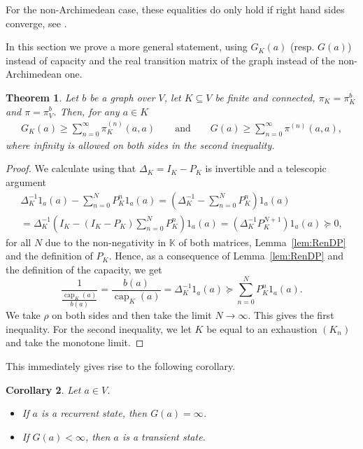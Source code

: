 \documentclass[a4paper,oneside, 12pt]{amsart}
\newtheorem{theorem}{Theorem}
\numberwithin{theorem}{section}
\newtheorem{corollary}[theorem]{Corollary}
\theoremstyle{definition}
\renewcommand{\c}{\operatorname{cap}}
\newcommand{\G}{{G}}
\newcommand{\prob}{\pi}
\begin{document}
{For the non-Archimedean case, these  equalities do only hold  if right hand sides converge, see \cite[Theorems 8.2 and 8.5]{OurPreprint}.



In this section we prove a more general statement, using $\G_K(a)$  (resp. $\G(a)$) instead of capacity and the real transition matrix of the graph instead of the non-Archimedean one.

\begin{theorem}
	Let $b$ be a  graph over $V$, let $K\subseteq V$ be finite and connected, $ \prob_{K}=\prob_{K}^{b} $ and $ \prob=\prob_{V}^{b} $. Then, for any $a\in K$ 
\begin{align*}
	\G_K(a)\ge \displaystyle\sum_{n=0}^\infty\prob^{(n)}_K(a,a)\qquad \mbox{and}\qquad
	G(a)\ge \sum_{n=0}^\infty\prob^{(n)}(a,a),
\end{align*}
	where infinity is allowed on both sides in the second inequality.
\end{theorem}
\begin{proof}
We calculate using that $ \Delta_{K}=I_{K}-P_{K} $ is invertible and a telescopic argument
	\begin{multline*}
		\Delta^{-1}_{K} 1_a(a)-\sum_{n=0}^{N}P_{K}^n 1_a(a)=\left(\Delta^{-1}_{K}-\sum_{n=0}^{N}P_{K}^n\right) 1_a(a)\\
		=\Delta^{-1}_{K}\left(I_{K}-(I_{K}-P_{K})\sum_{n=0}^{N}P_{K}^n\right) 1_a(a)=\left(\Delta^{-1}_{K}P_{K}^{N+1}\right) 1_a(a)\succeq 0,
	\end{multline*}
	for all $ N $ due to the non-negativity in $\mathbb{K}$ of both matrices, Lemma~\ref{lem:RenDP} and the definition of $P_K$. 
	Hence, as a consequence of Lemma~\ref{lem:RenDP} and the definition of the capacity, we get
	$$
\frac{1}{\frac{\c_K(a)}{b(a)}}=	\dfrac{b(a)}{\c_K(a)}=
	\Delta^{-1}_{K} 1_a(a)
	\succeq
	\sum_{n=0}^{N}P_K^n  1_a(a).
	$$
We take $\rho$ on both sides and then take the limit $ N\to\infty $. This gives the first inequality. For the second inequality, we let $ K $ be equal to an exhaustion $ (K_{n}) $ and take the monotone limit.
\end{proof}



This immediately gives rise to the following corollary.

\begin{corollary}\label{cor::rec} Let $ a\in V $.
	\begin{itemize}
		\item [(a)] If $ a $ is a recurrent state, then $\G(a)=\infty$.
		\item [(b)] If $ \G(a)<\infty $, then $ a $ is a transient state.
	\end{itemize} 
\end{corollary}


}
\end{document}
